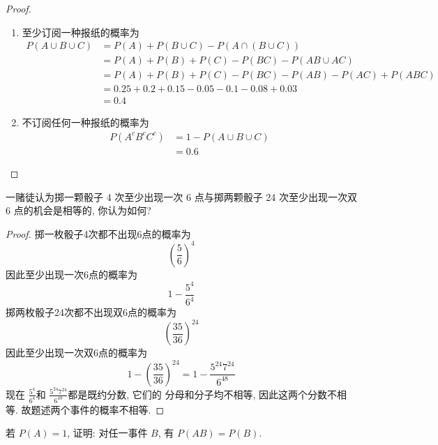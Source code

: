 \documentclass[../main.tex]{subfiles}
\begin{document}
\begin{proof}
\begin{enumerate}
\[\begin{aligned}
     &=    0.15-\left( 0.08+ 0.05-0.03 \right) \\ 
      &= 0.05
  \end{aligned} 
    \] 分别只订阅\(  A,B,C  \)报的事件两两互斥, 因此只订阅一种报的概率为它们的概率之和, 为 \[
    0.1 +  0.08 +  0.05= 0.23
    \] 
    \item 至少订阅一种报纸的概率为\[
    \begin{aligned}
    P\left( A\cup B\cup C \right)&= P\left( A \right)+ P\left( B\cup C \right)-P\left( A\cap \left( B\cup C \right)  \right)     \\ 
     &= P\left( A \right)+ P\left( B \right)+ P\left( C \right)-P\left( BC \right)-P\left( AB\cup AC \right)\\ 
      &= P\left( A \right)+ P\left( B \right)+ P\left( C \right)-P\left( BC \right)-P\left( AB \right)-P\left( AC \right)+ P\left( ABC \right)\\ 
       &= 0.25+ 0.2+ 0.15-0.05            -0.1- 0.08+ 0.03\\ 
        &= 0.4
    \end{aligned}
    \]
    \item 不订阅任何一种报纸的概率为 \[
    \begin{aligned}
    P\left( A^{c}B^{c}C^{c} \right)&= 1-P\left( A\cup B\cup C \right)\\ 
     &= 0.6  
    \end{aligned} 
    \]
    \end{enumerate}
    
\end{proof}

\begin{exercise}{}{}
一赌徒认为掷一颗骰子 4 次至少出现一次 6 点与掷两颗骰子 24 次至少出现一次双 6 点的机会是相等的, 你认为如何?
\end{exercise}
\begin{proof}
    掷一枚骰子4次都不出现6点的概率为 \[
    \left( \frac{5 }{6 }  \right)^{4} 
    \]因此至少出现一次6点的概率为 \[
    1-\frac{5^{4} }{6^{4} } 
    \]掷两枚骰子24次都不出现双6点的概率为 \[
    \left( \frac{35 }{36 }  \right)^{24} 
    \]因此至少出现一次双6点的概率为 \[
    1- \left( \frac{35 }{ 36}  \right)^{24} = 1-\frac{5^{24}7^{24} }{6^{48} } 
    \]现在 \(  \frac{5^{4} }{6^{4} }   \)和 \(  \frac{5^{24}7^{24} }{6^{48} }   \)都是既约分数, 它们的  分母和分子均不相等, 因此这两个分数不相等. 故题述两个事件的概率不相等.
\end{proof}
\begin{exercise}{}{}
若 $P(A) = 1$, 证明: 对任一事件 $B$, 有 $P(AB) = P(B)$.
\end{exercise}
\end{document}
